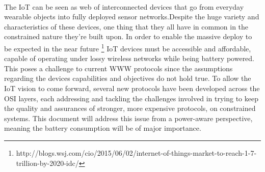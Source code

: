 \paragraph{}The \ac{IoT} can be seen as web of interconnected devices that go from everyday wearable objects into fully deployed sensor networks.Despite the huge variety and characteristics of these devices, one thing that they all have in common in the constrained nature they're built upon. In order to enable the massive deploy to be expected in the near future \footnote{http://blogs.wsj.com/cio/2015/06/02/internet-of-things-market-to-reach-1-7-trillion-by-2020-idc/} \ac{IoT} devices must be accessible and affordable, capable of operating under lossy wireless networks while being battery powered. This poses a challenge to current \ac{WWW} protocols since the assumptions regarding the devices capabilities and objectives do not hold true. To allow the \ac{IoT} vision to come forward, several new protocols have been developed across the OSI layers, each addressing and tackling the challenges involved in trying to keep the quality and assurances of stronger, more expensive protocols, on constrained systems. This document will address this issue from a power-aware perspective, meaning the battery consumption will be of major importance.
